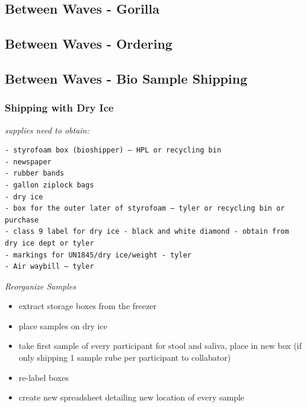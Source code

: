 \documentclass[
]{book}
\providecommand{\tightlist}{%
  \setlength{\itemsep}{0pt}\setlength{\parskip}{0pt}}
\begin{document}
\hypertarget{between-waves---gorilla}{%
\subsection{Between Waves - Gorilla}\label{between-waves---gorilla}}

\hypertarget{between-waves---ordering}{%
\subsection{Between Waves - Ordering}\label{between-waves---ordering}}

\hypertarget{between-waves---bio-sample-shipping}{%
\subsection{Between Waves - Bio Sample Shipping}\label{between-waves---bio-sample-shipping}}

\hypertarget{shipping-with-dry-ice}{%
\subsubsection{Shipping with Dry Ice}\label{shipping-with-dry-ice}}

\emph{supplies need to obtain:}

\begin{verbatim}
- styrofoam box (bioshipper) – HPL or recycling bin
- newspaper
- rubber bands
- gallon ziplock bags
- dry ice 
- box for the outer later of styrofoam – tyler or recycling bin or purchase
- class 9 label for dry ice - black and white diamond - obtain from dry ice dept or tyler 
- markings for UN1845/dry ice/weight - tyler
- Air waybill – tyler 
\end{verbatim}

\emph{Reorganize Samples}

\begin{itemize}
\tightlist
\item
  extract storage boxes from the freezer
\item
  place samples on dry ice
\item
  take first sample of every participant for stool and saliva, place in new box (if only shipping 1 sample rube per participant to collabator)
\item
  re-label boxes
\item
  create new spreadsheet detailing new location of every sample
\end{itemize}
\end{document}
